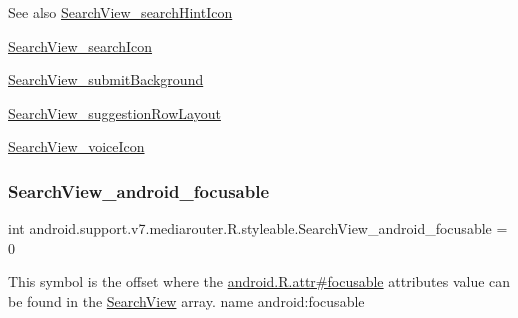 \begin{DoxySeeAlso}{See also}
\hyperlink{classandroid_1_1support_1_1v7_1_1mediarouter_1_1R_1_1styleable_aee7fbb570a505fe3f44e8575152ffd62}{Search\+View\+\_\+search\+Hint\+Icon} 

\hyperlink{classandroid_1_1support_1_1v7_1_1mediarouter_1_1R_1_1styleable_ab07321daa4d83a526ba178c813f21613}{Search\+View\+\_\+search\+Icon} 

\hyperlink{classandroid_1_1support_1_1v7_1_1mediarouter_1_1R_1_1styleable_ae515cfc893e5d3141dabbb0ddfecaa09}{Search\+View\+\_\+submit\+Background} 

\hyperlink{classandroid_1_1support_1_1v7_1_1mediarouter_1_1R_1_1styleable_aa17d257e1bac480445b5018c0512ade5}{Search\+View\+\_\+suggestion\+Row\+Layout} 

\hyperlink{classandroid_1_1support_1_1v7_1_1mediarouter_1_1R_1_1styleable_a3d6a51de35b16974fa4a58f2beddf32d}{Search\+View\+\_\+voice\+Icon} 
\end{DoxySeeAlso}
\mbox{\label{classandroid_1_1support_1_1v7_1_1mediarouter_1_1R_1_1styleable_a409578cfacc43a6019fc4ba0da3b4ac7}} 
\subsubsection{\texorpdfstring{Search\+View\+\_\+android\+\_\+focusable}{SearchView\_android\_focusable}}
{\footnotesize\ttfamily int android.\+support.\+v7.\+mediarouter.\+R.\+styleable.\+Search\+View\+\_\+android\+\_\+focusable = 0\hspace{0.3cm}{\ttfamily [static]}}

This symbol is the offset where the \hyperlink{}{android.\+R.\+attr\#focusable} attribute\textquotesingle{}s value can be found in the \hyperlink{classandroid_1_1support_1_1v7_1_1mediarouter_1_1R_1_1styleable_a5573e3195bf93122a37c69394418c7d7}{Search\+View} array.  name android\+:focusable \mbox{\label{classandroid_1_1support_1_1v7_1_1mediarouter_1_1R_1_1styleable_aac95101925665a6dff1249a18559dad5}} 

